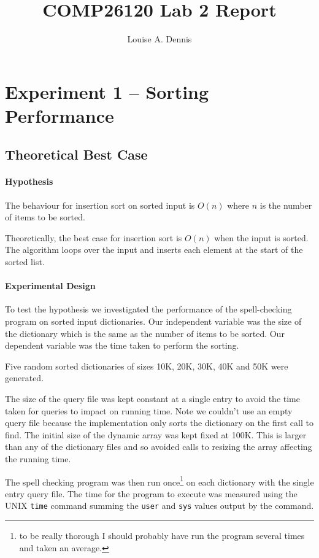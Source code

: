 \documentclass[a4]{article}
\title{COMP26120 Lab 2 Report}
\author{Louise A. Dennis}
\begin{document}
\maketitle

\section{Experiment 1 -- Sorting Performance}
\label{sec:exp_1}

\subsection{Theoretical Best Case}
\label{sec:best_case}

\paragraph{Hypothesis} The behaviour for insertion sort on sorted input is $O(n)$ where $n$ is the number of items to be sorted. 

Theoretically, the best case for insertion sort is $O(n)$ when the input is sorted.  The algorithm loops over the input and inserts each element at the start of the sorted list.  

\paragraph{Experimental Design} 
To test the hypothesis we investigated the performance of the spell-checking program on sorted input dictionaries.  Our independent variable was the size of the dictionary which is the same as the number of items to be sorted.  Our dependent variable was the time taken to perform the sorting.

Five random sorted dictionaries of sizes 10K, 20K, 30K, 40K and 50K were generated.

The size of the query file was kept constant at a single entry to avoid the time taken for queries to impact on running time.  Note we couldn't use an empty query file because the implementation only sorts the dictionary on the first call to find.  The initial size of the dynamic array was kept fixed at 100K.  This is larger than any of the dictionary files and so avoided calls to resizing the array affecting the running time.

The spell checking program was then run once\footnote{to be really thorough I should probably have run the program several times and taken an average.} on each dictionary with the single entry query file.  The time for the program to execute was measured using the UNIX \texttt{time} command summing the \texttt{user} and \texttt{sys} values output by the command.  
\end{document}
